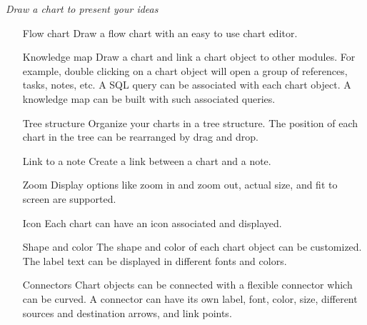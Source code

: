 \textit{Draw a chart to present your ideas}
\begin{itemize}

 \item[Flow chart] Draw a flow chart with an easy to use chart editor.

 \item[Knowledge map] Draw a chart and link a chart object to other
 modules. For example, double clicking on a chart object will open a
 group of references, tasks, notes, etc. A SQL query can be
 associated with each chart object. A knowledge map can be built
 with such associated queries.

 \item[Tree structure] Organize your charts in a tree structure. The
 position of each chart in the tree can be rearranged by drag and
 drop.

 \item[Link to a note] Create a link between a chart and a note.

 \item[Zoom Display] options like zoom in and zoom out, actual size, and
 fit to screen are supported.

 \item[Icon] Each chart can have an icon associated and displayed.

 \item[Shape and color] The shape and color of each chart object can be
 customized. The label text can be displayed in different fonts and
 colors.

 \item[Connectors] Chart objects can be connected with a flexible
 connector which can be curved. A connector can have its own
 label, font, color, size, different sources and destination arrows,
 and link points.
 
\end{itemize}


